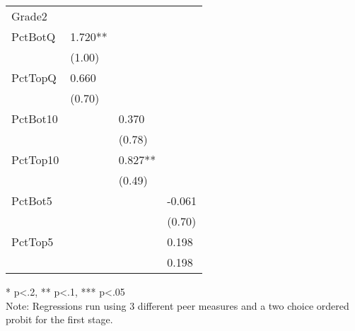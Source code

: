 \begin{table}[htb]
\begin{threeparttable}
\begin{tabular}{l l l l}
      Grade2   &                               &                               &                              \\
      PctBotQ  & 1.720**                       &                               &                              \\
               & (1.00)                        &                               &                              \\
      PctTopQ  & 0.660                         &                               &                              \\
               & (0.70)                        &                               &                              \\
      PctBot10 &                               & 0.370                         &                              \\
               &                               & (0.78)                        &                              \\
      PctTop10 &                               & 0.827**                       &                              \\
               &                               & (0.49)                        &                              \\
      PctBot5  &                               &                               & -0.061                       \\
               &                               &                               & (0.70)                       \\
      PctTop5  &                               &                               & 0.198                        \\
               &                               &                               & 0.198                        \\
      \hline
      \hline
    \end{tabular}
    \begin{tablenotes}
    \item{* p<.2, ** p<.1, *** p<.05 \\Note: Regressions run using 3 different peer measures and a two choice ordered probit for the first stage.}
    \end{tablenotes}
  \end{threeparttable}
\end{table}

\clearpage{}

